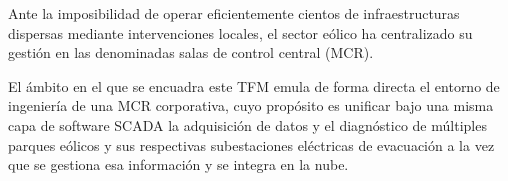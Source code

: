 Ante la imposibilidad de operar eficientemente cientos de infraestructuras dispersas mediante intervenciones locales, el sector eólico ha centralizado su gestión en las denominadas salas de control central (\ac{MCR}).\par

El ámbito en el que se encuadra este \ac{TFM} emula de forma directa el entorno de ingeniería de una \ac{MCR} corporativa, cuyo propósito es unificar bajo una misma capa de software \ac{SCADA} la adquisición de datos y el diagnóstico de múltiples parques eólicos y sus respectivas subestaciones eléctricas de evacuación a la vez que se gestiona esa información y se integra en la nube.
